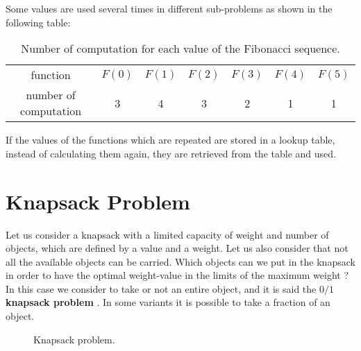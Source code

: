 Some values are used several times in different sub-problems as shown in the following table:
\begin{table}[H]
	\centering
	\begin{tabular}{c c c c c c c}
	function & $F(0)$ & $F(1)$ & $F(2)$ & $F(3)$ & $F(4)$ & $F(5)$ \\
	number of computation & 3 & 4 & 3 & 2 & 1 & 1
	\end{tabular}
	\caption[Number of computation for each value of the Fibonacci sequence.]{Number of computation for each value of the Fibonacci sequence.}
\end{table}
If the values of the functions which are repeated are stored in a lookup table, instead of calculating them again, they are retrieved from the table and used.

\section{Knapsack Problem}
Let us consider a knapsack with a limited capacity of weight and number of objects, which are defined by a value and a weight. Let us also consider that not all the available objects can be carried. Which objects can we put in the knapsack in order to have the optimal weight-value in the limits of the maximum weight \cite{wikiknapsackproblem}? In this case we consider to take or not an entire object, and it is said the \textbf{\(0/1\) knapsack problem} . In some variants it is possible to take a fraction of an object.

\begin{figure}[H]
\centering
{}
\caption[Knapsack problem.]{Knapsack problem.}
\end{figure}

